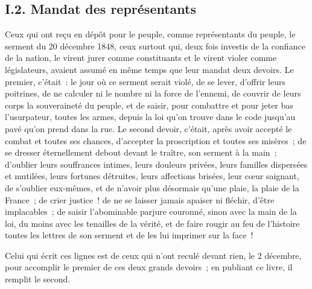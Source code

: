 \documentclass[french,twoside]{book} %
\begin{document}
\subsection[{I.2. Mandat des représentants}]{I.2. Mandat des représentants}
\noindent Ceux qui ont reçu en dépôt pour le peuple, comme représentants du peuple, le serment du 20 décembre 1848, ceux surtout qui, deux fois investis de la confiance de la nation, le virent jurer comme constituants et le virent violer comme législateurs, avaient assumé en même temps que leur mandat deux devoirs. Le premier, c’était : le jour où ce serment serait violé, de se lever, d’offrir leurs poitrines, de ne calculer ni le nombre ni la force de l’ennemi, de couvrir de leurs corps la souveraineté du peuple, et de saisir, pour combattre et pour jeter bas l’usurpateur, toutes les armes, depuis la loi qu’on trouve dans le code jusqu’au pavé qu’on prend dans la rue. Le second devoir, c’était, après avoir accepté le combat et toutes ses chances, d’accepter la proscription et toutes ses misères ; de se dresser éternellement debout devant le traître, son serment à la main ; d’oublier leurs souffrances intimes, leurs douleurs privées, leurs familles dispersées et mutilées, leurs fortunes détruites, leurs affections brisées, leur cœur saignant, de s’oublier eux-mêmes, et de n’avoir plus désormais qu’une plaie, la plaie de la France ; de crier justice ! de ne se laisser jamais apaiser ni fléchir, d’être implacables ; de saisir l’abominable parjure couronné, sinon avec la main de la loi, du moins avec les tenailles de la vérité, et de faire rougir au feu de l’histoire toutes les lettres de son serment et de les lui imprimer sur la face !\par
Celui qui écrit ces lignes est de ceux qui n’ont reculé devant rien, le 2 décembre, pour accomplir le premier de ces deux grands devoirs ; en publiant ce livre, il remplit le second.
\end{document}
